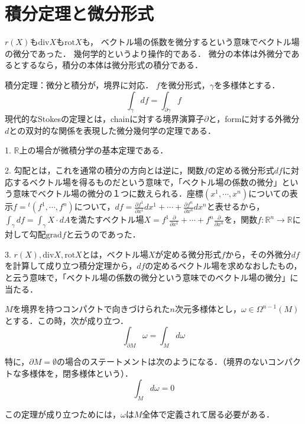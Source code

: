 \documentclass[uplatex, dvipdfmx]{jsreport}
\begin{document}
\section{積分定理と微分形式}
$r(X)$も$\mathrm{div}X$も$\mathrm{rot}X$も，
ベクトル場の係数を微分するという意味でベクトル場の微分であった．
幾何学的というより操作的である．
微分の本体は外微分であるとするなら，積分の本体は微分形式の積分である．

\begin{itembox}[l]{積分定理：微分と積分が，境界に対応．}
    $f$を微分形式，$\gamma$を多様体とする．
    \[\int_\gamma df=\int_{\partial\gamma}f\]
    現代的なStokesの定理とは，chainに対する境界演算子$\partial$と，formに対する外微分$d$との双対的な関係を表現した微分幾何学の定理である．
\end{itembox}
\begin{remark}
    1. $\mathbb{R}$上の場合が微積分学の基本定理である．

    2. 勾配とは，これを通常の積分の方向とは逆に，関数$f$の定める微分形式$df$に対応するベクトル場を得るものだという意味で，「ベクトル場の係数の微分」という意味でベクトル場の微分の１つに数えられる．座標$(x^1,\cdots,x^n)$についての表示$f={}^t(f^1,\cdots,f^n)$について，$df=\frac{\partial f^1}{\partial x^1}dx^1+\cdots+\frac{\partial f^n}{\partial x^n}dx^n$と表せるから，
    $\int_\gamma df=\int_\gamma X\cdot dA$を満たすベクトル場$X=f^1\frac{\partial}{\partial x^1}+\cdots +f^n\frac{\partial}{\partial x^n}$を，関数$f:\mathbb{R}^n\to\mathbb{R}$に対して勾配$\mathrm{grad}f$と云うのであった．

    3. $r(X),\mathrm{div}X,\mathrm{rot}X$とは，ベクトル場$X$が定める微分形式$f$から，その外微分$df$を計算して成り立つ積分定理から，$df$の定めるベクトル場を求めなおしたもの，と云う意味で，「ベクトル場の係数の微分という意味でのベクトル場の微分」に当たる．
\end{remark}

\begin{shadebox}
    \begin{theorem}[Bourbaki後のStokesの定理]
        $M$を境界を持つコンパクトで向きづけられた$n$次元多様体とし，$\omega\in\Omega^{n-1}(M)$とする．この時，次が成り立つ．
        \[ \int_{\partial M}\omega=\int_Md\omega \]

        特に，$\partial M=\emptyset$の場合のステートメントは次のようになる．（境界のないコンパクトな多様体を，閉多様体という）．
        \[ \int_M d\omega=0 \]
    \end{theorem}
\end{shadebox}
\begin{remark}
    この定理が成り立つためには，$\omega$は$M$全体で定義されて居る必要がある．
\end{remark}
\end{document}
